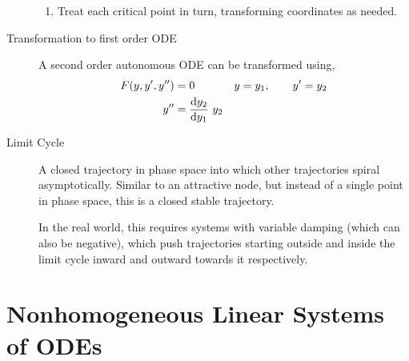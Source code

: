 \begin{description}
\begin{enumerate}
            \item Treat each critical point in turn, transforming coordinates as
                  needed.
        \end{enumerate}
    \item[Transformation to first order ODE] A second order autonomous ODE can
        be transformed using,
        \begin{align}
            F(y, y', y'') & = 0                    & y & = y_1, \qquad y' = y_2 \\
            y''           & = \diff{y_2}{y_1}\ y_2
        \end{align}
    \item[Limit Cycle] A closed trajectory in phase space into which other trajectories
        spiral asymptotically. Similar to an attractive node, but instead of a single point
        in phase space, this is a closed stable trajectory. \par

        In the real world, this requires systems with variable damping (which can also be
        negative), which push trajectories starting outside and inside the limit cycle
        inward and outward towards it
        respectively.
\end{description}

\section{Nonhomogeneous Linear Systems of ODEs}

